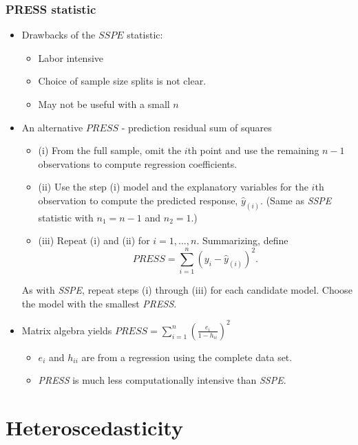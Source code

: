 \begin{frame}[shrink=10]
 \frametitle{PRESS statistic}
 \begin{itemize}
   \item Drawbacks of the $SSPE$ statistic:
\begin{itemize}
   \item Labor intensive
\item Choice of sample size splits is not clear.
\item May not be useful with a small $n$
   \end{itemize}
\item An alternative $PRESS$ -
prediction residual sum of squares
\begin{itemize}
\item (i) From the full sample, omit the $i$th point and use the remaining
$n-1$ observations to compute regression coefficients.

\item (ii) Use the step (i) model and the explanatory
variables for the $i$th observation to compute the predicted response, $\hat{y}%
_{(i)}$. (Same as \textit{SSPE} statistic with $n_{1}=n-1$ and
$n_{2}=1$.)

\item (iii) Repeat (i) and (ii) for $i=1,...,n$. Summarizing, define
\begin{equation*}
PRESS=\sum_{i=1}^{n}(y_{i}-\hat{y}_{(i)})^{2}.
\end{equation*}

\end{itemize}

\small{As with \textit{SSPE}, repeat steps (i) through (iii) for
each candidate model. Choose the model with the smallest
\textit{PRESS}.}

\item Matrix algebra yields
$PRESS=\sum_{i=1}^{n}\left(\frac{e_i}{1-h_{ii}}\right)^{2}$
\begin{itemize}
\item $e_i$ and $h_{ii}$ are from a regression using the complete data set.
\item \textit{PRESS} is much less computationally intensive than \textit{SSPE}.
    \end{itemize}\end{itemize}
\end{frame}

\section{Heteroscedasticity}

